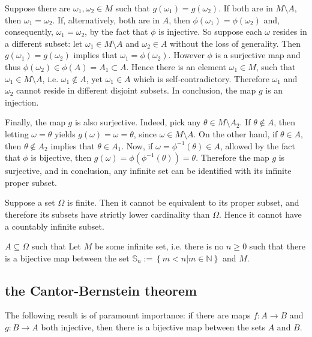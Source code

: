 \documentclass[a4paper]{article}
\newcommand{\obj}[1]{\left\{{#1}\right\}}
\newcommand{\brac}[1]{{\left({#1}\right)}}
\begin{document}
Suppose there are $\omega_1,\omega_2\in M$ such that $g(\omega_1)=g(\omega_2)$. If both are in $M\setminus A$, then $\omega_1=\omega_2$. If, alternatively, both are in $A$, then $\phi(\omega_1)=\phi(\omega_2)$ and, consequently, $\omega_1=\omega_2$, by the fact that $\phi$ is injective. So suppose each $\omega$ resides in a different subset: let $\omega_1\in M\setminus A$ and $\omega_2\in A$ without the loss of generality. Then $g(\omega_1)=g(\omega_2)$ implies that $\omega_1=\phi(\omega_2)$. However $\phi$ is a surjective map and thus $\phi(\omega_2)\in \phi(A)=A_1\subset A$. Hence there is an element $\omega_1\in M$, such that $\omega_1\in M\setminus A$, i.e. $\omega_1\notin A$, yet $\omega_1\in A$ which is self-contradictory. Therefore $\omega_1$ and $\omega_2$ cannot reside in different disjoint subsets. In conclusion, the map $g$ is an injection.

Finally, the map $g$ is also surjective. Indeed, pick any $\theta\in M\setminus A_2$. If $\theta \notin A$, then letting $\omega=\theta$ yields $g(\omega)=\omega=\theta$, since $\omega\in M\setminus A$. On the other hand, if $\theta\in A$, then $\theta\notin A_2$ implies that $\theta\in A_1$. Now, if $\omega=\phi^{-1}(\theta)\in A$, allowed by the fact that $\phi$ is bijective, then $g(\omega)=\phi\brac{\phi^{-1}(\theta)}=\theta$. Therefore the map $g$ is surjective, and in conclusion, any infinite set can be identified with its infinite proper subset.


Suppose a set $\Omega$ is finite. Then it cannot be equivalent to its proper subset, and therefore its subsets have strictly lower cardinality than $\Omega$. Hence it cannot have a countably infinite subset.

$A\subseteq \Omega$ such that 
Let $M$ be some infinite set, i.e. there is no $n \geq 0$ such that there is a bijective map between the set $\mathbb{S}_n := \obj{ m < n \vert m\in \mathbb{N}}$ and $M$.





\subsection{the Cantor-Bernstein theorem} %
\label{sub:the_cantor_bernstein_theorem}
The following result is of paramount importance: if there are maps $f:A\to B$ and $g:B\to A$ both injective, then there is a bijective map between the sets $A$ and $B$.
\end{document}
